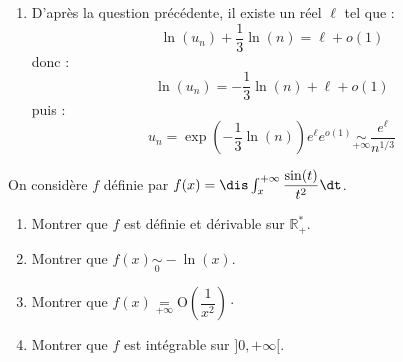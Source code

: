 \documentclass[a4paper,10pt]{report}
\begin{document}
\begin{enumerate}
\item D'après la question précédente, il existe un réel $\ell$ tel que :
$$ \ln(u_n) + \dfrac{1}{3} \ln(n) = \ell + o(1)$$
donc :
$$ \ln(u_n) = - \dfrac{1}{3} \ln(n) + \ell + o(1)$$
puis :
$$ u_n = \exp \left( - \dfrac{1}{3} \ln(n) \right) e^{\ell} e^{o(1)} \underset{+ \infty}{\sim} \dfrac{e^{\ell}}{n^{1/3}}$$
\end{enumerate}

\begin{Exa} On considère $f$ définie par $f(x)= \dis \int_x^{+ \infty} \dfrac{\sin(t)}{t^2} \dt$.
\begin{enumerate}
\item Montrer que $f$ est définie et dérivable sur $\mathbb{R}_+^{*}$.
\item Montrer que $f(x) \underset{0}{\sim} -\ln(x)$.
\item Montrer que $f(x) \underset{+ \infty}{=} \textrm{O} \left( \dfrac{1}{x^2} \right) \cdot$
\item Montrer que $f$ est intégrable sur $]0, + \infty[$.
\end{enumerate}
\end{Exa}
\end{document}
